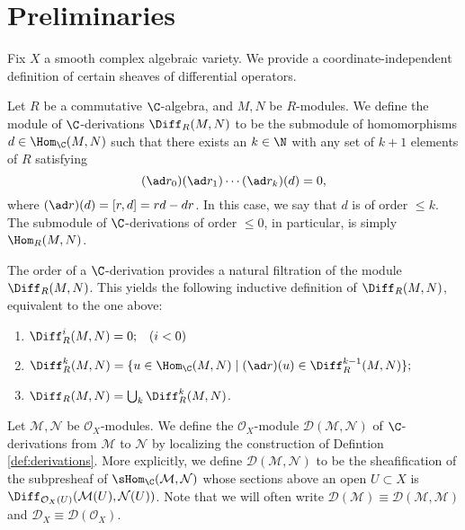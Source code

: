 \chapter{Preliminaries}


Fix $X$ a smooth complex algebraic variety. We provide a coordinate-independent definition
of certain sheaves of differential operators.

\begin{definition}
    Let $R$ be a commutative $\C$-algebra, and $M,N$ be $R$-modules.
    We define the module of $\C$-derivations $\Diff_R(M,N)$ to be the submodule
    of homomorphisms $d\in\Hom_\C(M,N)$ such that there exists an $k\in\N$ with any set
    of $k+1$ elements of $R$ satisfying
    \begin{equation}
        (\ad r_0)(\ad r_1)\cdots(\ad r_k)(d)=0,
        \label{eq:ad}
    \end{equation}
    where $(\ad r)(d)=[r,d]=rd-dr$. In this case, we say that $d$ is of order $\leqslant k$.
    The submodule of $\C$-derivations of order $\leqslant 0$, in particular, is simply
    $\Hom_R(M,N)$.
    \label{def:derivations}
\end{definition}

\begin{remark}
    The order of a $\C$-derivation provides a natural filtration of the module $\Diff_R(M,N)$.
    This yields the following inductive definition of $\Diff_R(M,N)$, equivalent to the one
    above:
    \begin{enumerate}
        \item[] $\Diff^{i}_R(M,N) = 0; \;\;\;(i<0)$
        \item[] $\Diff^k_R(M,N) = \{u\in\Hom_\C(M,N)\mid (\ad r)(u)\in \Diff^{k-1}_R(M,N)\};$
        \item[] $\Diff_R(M,N)=\bigcup_k\Diff^k_R(M,N)$.
    \end{enumerate}
\end{remark}

\begin{definition}
    Let $\mathcal{M},\mathcal{N}$ be $\mathcal{O}_X$-modules. We define the
    $\mathcal{O}_X$-module $\mathscr{D}(\mathcal{M},\mathcal{N})$ of $\C$-derivations
    from $\mathcal{M}$ to $\mathcal{N}$ by localizing the construction of Defintion \ref{def:derivations}.
    More explicitly, we define $\mathscr{D}(\mathcal{M},\mathcal{N})$ to be
    the sheafification of the subpresheaf of $\sHom_\C(\mathcal{M},\mathcal{N})$
    whose sections above an open $U\subset X$ is $\Diff_{\mathcal{O}_X(U)}(\mathcal{M}(U),\mathcal{N}(U))$.
    Note that we will often write $\mathscr{D}(\mathcal{M})\equiv\mathscr{D}(\mathcal{M,M})$ and
    $\mathscr{D}_X\equiv\mathscr{D}(\mathcal{O}_X)$.
    \label{def:D_X}
\end{definition}

